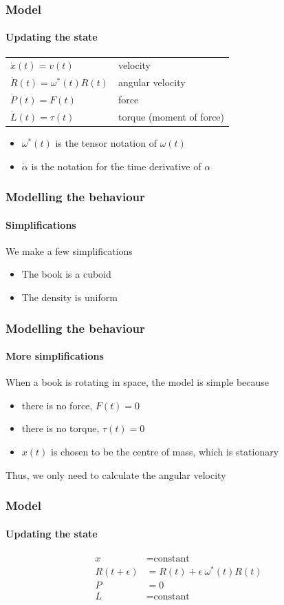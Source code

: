 \documentclass{beamer}
\begin{document}
\begin{frame}
 \frametitle{Model}
 \framesubtitle{Updating the state}
  \begin{table}
  \centering
    \begin{tabular}{ll}
    $\dot{x}(t) = v(t)$ & velocity \\
    $\dot{R}(t) = \omega^*(t) R(t)$ & angular velocity \\
    $\dot{P}(t) = F(t)$ & force \\
    $\dot{L}(t) = \tau(t)$ & torque (moment of force) \\ 
    \end{tabular}
  \end{table}

\begin{itemize}
 \item $\omega^*(t)$ is the tensor notation of $\omega(t)$
 \item $\dot{\alpha}$ is the notation for the time derivative of $\alpha$
\end{itemize}

\end{frame}

\begin{frame}
 \frametitle{Modelling the behaviour}
 \framesubtitle{Simplifications}
 We make a few simplifications
 \begin{itemize}
  \item The book is a cuboid
  \item The density is uniform
 \end{itemize}
\end{frame}

\begin{frame}
 \frametitle{Modelling the behaviour}
 \framesubtitle{More simplifications}
 When a book is rotating in space, the model is simple because
 \begin{itemize}
  \item there is no force, $F(t) = 0$
  \item there is no torque, $\tau(t) = 0$
  \item $x(t)$ is chosen to be the centre of mass, which is stationary
 \end{itemize}
 Thus, we only need to calculate the angular velocity
\end{frame}

\begin{frame}
 \frametitle{Model}
 \framesubtitle{Updating the state}
\begin{align*}
    x & = \mbox{constant} \\
    R(t + \epsilon) & = R(t) + \epsilon ~ \omega^*(t) R(t)\\
    P & = 0 \\
    L & = \mbox{constant}
\end{align*}
\end{frame}
\end{document}
